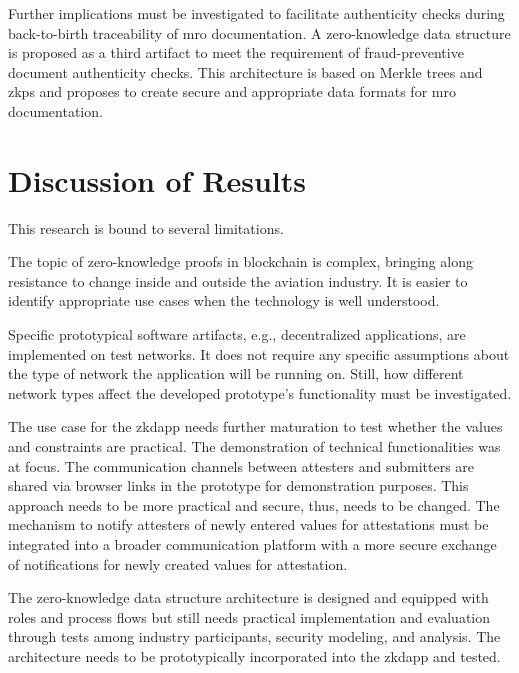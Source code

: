 Further implications must be investigated to facilitate authenticity checks during back-to-birth traceability of \acrshort{mro} documentation. A zero-knowledge data structure is proposed as a third artifact to meet the requirement of fraud-preventive document authenticity checks. This architecture is based on Merkle trees and \acrshort{zkp}s and proposes to create secure and appropriate data formats for \acrshort{mro} documentation.

\section{Discussion of Results}
This research is bound to several limitations. 

The topic of zero-knowledge proofs in blockchain is complex, bringing along resistance to change inside and outside the aviation industry. It is easier to identify appropriate use cases when the technology is well understood.

Specific prototypical software artifacts, e.g., decentralized applications,  are implemented on test networks. It does not require any specific assumptions about the type of network the application will be running on. Still, how different network types affect the developed prototype's functionality must be investigated.

The use case for the \acrshort{zkdapp} needs further maturation to test whether the values and constraints are practical. The demonstration of technical functionalities was at focus. The communication channels between attesters and submitters are shared via browser links in the prototype for demonstration purposes. This approach needs to be more practical and secure, thus, needs to be changed. The mechanism to notify attesters of newly entered values for attestations must be integrated into a broader communication platform with a more secure exchange of notifications for newly created values for attestation.

The zero-knowledge data structure architecture is designed and equipped with roles and process flows but still needs practical implementation and evaluation through tests among industry participants, security modeling, and analysis. The architecture needs to be prototypically incorporated into the \acrshort{zkdapp} and tested.
 
\begin{comment}
-noch die rapado project workshop slides durchschauen
\end{comment}

